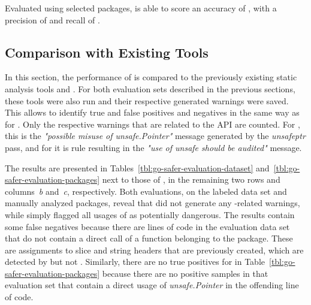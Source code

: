 \begin{hero}
    Evaluated using  selected packages, \toolSafer{} is able to score an accuracy of , with
    a precision of  and recall of .
\end{hero}



\subsection{Comparison with Existing Tools}\label{subsec:go-safer:evaluation:linters-comparison}

In this section, the performance of \toolSafer{} is compared to the previously existing static analysis tools \toolVet{}
and \toolGosec{}.
For both evaluation sets described in the previous sections, these tools were also run and their respective generated
warnings were saved.
This allows to identify true and false positives and negatives in the same way as for \toolSafer{}.
Only the respective warnings that are related to the \unsafe{} \acrshort{API} are counted.
For \toolVet{}, this is the \textit{"possible misuse of unsafe.Pointer"} message generated by the \textit{unsafeptr}
pass, and for \toolGosec{} it is rule  resulting in the \textit{"use of unsafe should be
audited"} message.

The results are presented in Tables~\ref{tbl:go-safer-evaluation-dataset} and~\ref{tbl:go-safer-evaluation-packages}
next to those of \toolSafer{}, in the remaining two rows and columns~\textit{b} and~\textit{c}, respectively.
Both evaluations, on the labeled data set and  manually analyzed packages, reveal that \toolVet{} did not
generate any \unsafe{}-related warnings, while \toolGosec{} simply flagged all usages of \unsafe{} as potentially
dangerous.
The \toolGosec{} results contain some false negatives because there are lines of code in the evaluation data set that do
not contain a direct call of a function belonging to the \unsafe{} package.
These are assignments to slice and string headers that are previously created, which are detected by \toolSafer{} but
not \toolGosec{}.
Similarly, there are no true positives for \toolGosec{} in Table~\ref{tbl:go-safer-evaluation-packages} because there
are no positive samples in that evaluation set that contain a direct usage of \textit{unsafe.Pointer} in the offending
line of code.

